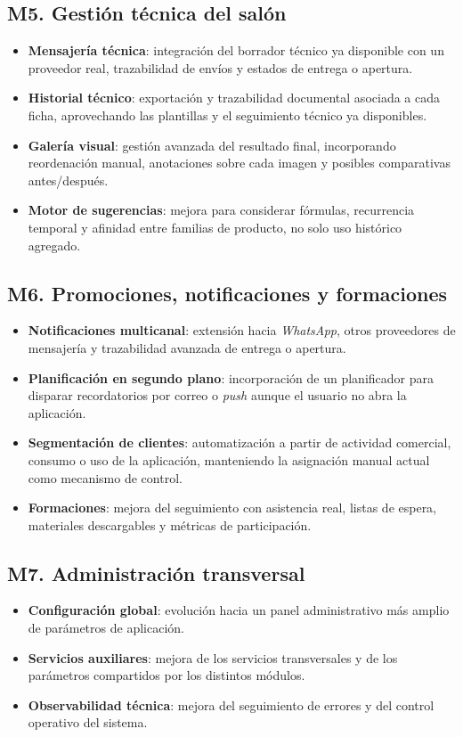 \subsection*{M5. Gestión técnica del salón}
\begin{itemize}
    \item \textbf{Mensajería técnica}: integración del borrador técnico ya disponible con un proveedor real, trazabilidad de envíos y estados de entrega o apertura.
    \item \textbf{Historial técnico}: exportación y trazabilidad documental asociada a cada ficha, aprovechando las plantillas y el seguimiento técnico ya disponibles.
    \item \textbf{Galería visual}: gestión avanzada del resultado final, incorporando reordenación manual, anotaciones sobre cada imagen y posibles comparativas antes/después.
    \item \textbf{Motor de sugerencias}: mejora para considerar fórmulas, recurrencia temporal y afinidad entre familias de producto, no solo uso histórico agregado.
\end{itemize}

\subsection*{M6. Promociones, notificaciones y formaciones}
\begin{itemize}
    \item \textbf{Notificaciones multicanal}: extensión hacia \textit{WhatsApp}, otros proveedores de mensajería y trazabilidad avanzada de entrega o apertura.
    \item \textbf{Planificación en segundo plano}: incorporación de un planificador para disparar recordatorios por correo o \textit{push} aunque el usuario no abra la aplicación.
    \item \textbf{Segmentación de clientes}: automatización a partir de actividad comercial, consumo o uso de la aplicación, manteniendo la asignación manual actual como mecanismo de control.
    \item \textbf{Formaciones}: mejora del seguimiento con asistencia real, listas de espera, materiales descargables y métricas de participación.
\end{itemize}

\subsection*{M7. Administración transversal}
\begin{itemize}
    \item \textbf{Configuración global}: evolución hacia un panel administrativo más amplio de parámetros de aplicación.
    \item \textbf{Servicios auxiliares}: mejora de los servicios transversales y de los parámetros compartidos por los distintos módulos.
    \item \textbf{Observabilidad técnica}: mejora del seguimiento de errores y del control operativo del sistema.
\end{itemize}


